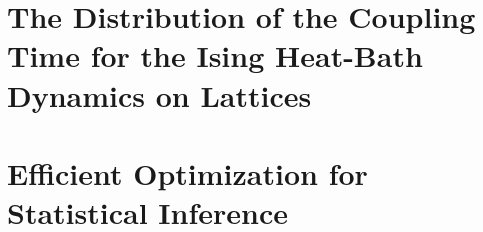 \documentclass[11pt, oneside]{Thesis} %
\begin{document}

\part{The Distribution of the Coupling Time for the Ising Heat-Bath Dynamics on Lattices}
\label{part:coupling time}







\part{Efficient Optimization for Statistical Inference}
\label{part:optimization for stats}
% 

% 

% 



% 
% 



\appendix

% 

\backmatter


\label{Bibliography}


\end{document}
